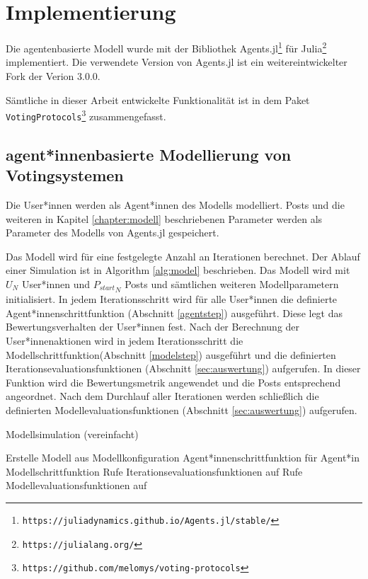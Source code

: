 \chapter{Implementierung}

Die agentenbasierte Modell wurde mit der Bibliothek Agents.jl\footnote{\texttt{https://juliadynamics.github.io/Agents.jl/stable/}} für Julia\footnote{\texttt{https://julialang.org/}} implementiert. Die verwendete Version von Agents.jl ist ein weitereintwickelter Fork der Verion 3.0.0.
	
Sämtliche in dieser Arbeit entwickelte Funktionalität ist in dem Paket \texttt{VotingProtocols}\footnote{\texttt{https://github.com/melomys/voting-protocols}} zusammengefasst.


\section{agent*innenbasierte Modellierung von Votingsystemen}

Die User*innen werden als Agent*innen des Modells modelliert. Posts und die weiteren in Kapitel \ref{chapter:modell} beschriebenen Parameter werden als Parameter des Modells von Agents.jl gespeichert. 

Das Modell wird für eine festgelegte Anzahl an Iterationen berechnet. Der Ablauf einer Simulation ist in Algorithm \ref{alg:model} beschrieben. Das Modell wird mit $U_N$ User*innen und ${P_{start}}_{N}$ Posts und sämtlichen weiteren Modellparametern initialisiert. In jedem Iterationsschritt wird für alle User*innen die definierte Agent*innenschrittfunktion (Abschnitt \ref{agentstep}) ausgeführt. Diese legt das Bewertungsverhalten der User*innen fest. Nach der Berechnung der User*innenaktionen wird in jedem Iterationsschritt die Modellschrittfunktion(Abschnitt \ref{modelstep}) ausgeführt und die definierten Iterationsevaluationsfunktionen (Abschnitt \ref{sec:auswertung}) aufgerufen. In dieser Funktion wird die Bewertungsmetrik angewendet und die Posts entsprechend angeordnet. Nach dem Durchlauf aller Iterationen werden schließlich die definierten Modellevaluationsfunktionen (Abschnitt \ref{sec:auswertung}) aufgerufen.

\captionsetup[figure]{name=Algorithmus}
\begin{algorithm}
			\caption{Modellsimulation (vereinfacht)}
	\begin{algorithmic}
			\State Erstelle Modell aus Modellkonfiguration
					\State Agent*innenschrittfunktion für Agent*in
				\EndFor
				\State Modellschrittfunktion
				\State Rufe Iterationsevaluationsfunktionen auf
			\EndFor
			\State Rufe Modellevaluationsfunktionen auf
	\end{algorithmic}
	\label{alg:model}
\end{algorithm}



